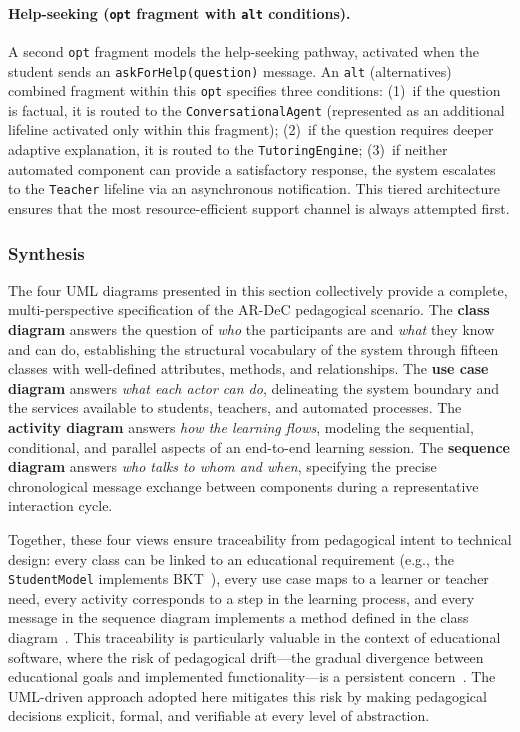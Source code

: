 \paragraph{Help-seeking (\texttt{opt} fragment with \texttt{alt} conditions).}
A second \texttt{opt} fragment models the help-seeking pathway, activated when the student sends an \texttt{askForHelp(question)} message. An \texttt{alt} (alternatives) combined fragment within this \texttt{opt} specifies three conditions: (1)~if the question is factual, it is routed to the \texttt{ConversationalAgent} (represented as an additional lifeline activated only within this fragment); (2)~if the question requires deeper adaptive explanation, it is routed to the \texttt{TutoringEngine}; (3)~if neither automated component can provide a satisfactory response, the system escalates to the \texttt{Teacher} lifeline via an asynchronous notification. This tiered architecture ensures that the most resource-efficient support channel is always attempted first.

\subsubsection{Synthesis}
\label{sec:synthesis}

The four UML diagrams presented in this section collectively provide a complete, multi-perspective specification of the AR-DeC pedagogical scenario. The \textbf{class diagram} answers the question of \emph{who} the participants are and \emph{what} they know and can do, establishing the structural vocabulary of the system through fifteen classes with well-defined attributes, methods, and relationships. The \textbf{use case diagram} answers \emph{what each actor can do}, delineating the system boundary and the services available to students, teachers, and automated processes. The \textbf{activity diagram} answers \emph{how the learning flows}, modeling the sequential, conditional, and parallel aspects of an end-to-end learning session. The \textbf{sequence diagram} answers \emph{who talks to whom and when}, specifying the precise chronological message exchange between components during a representative interaction cycle.

Together, these four views ensure traceability from pedagogical intent to technical design: every class can be linked to an educational requirement (e.g., the \texttt{StudentModel} implements BKT~\cite{Corbett1994}), every use case maps to a learner or teacher need, every activity corresponds to a step in the learning process, and every message in the sequence diagram implements a method defined in the class diagram~\cite{Booch2005,Rumbaugh2004}. This traceability is particularly valuable in the context of educational software, where the risk of pedagogical drift---the gradual divergence between educational goals and implemented functionality---is a persistent concern~\cite{Ouariach2023,Ouariach2026}. The UML-driven approach adopted here mitigates this risk by making pedagogical decisions explicit, formal, and verifiable at every level of abstraction.
